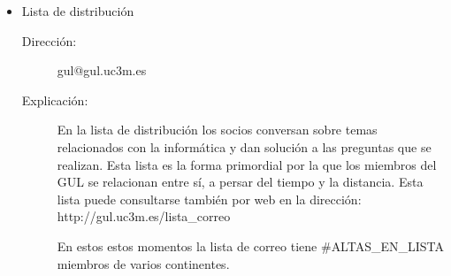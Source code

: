 \documentclass[a4paper,12pt]{report}
\begin{document}
\begin{enumerate}
\begin{itemize}
\pagebreak
\item Lista de distribución
\begin{description}
\item[Dirección:] gul@gul.uc3m.es
\item[Explicación:] En la lista de distribución los socios conversan sobre
temas relacionados con la informática y dan solución a las preguntas que
se realizan. Esta lista es la forma primordial por la que los miembros del GUL se relacionan entre sí, a persar del tiempo y la distancia.
Esta lista puede consultarse también por web en la dirección:
http://gul.uc3m.es/lista\_correo

En estos estos momentos la lista de correo tiene #{ALTAS_EN_LISTA} miembros de varios continentes.


\end{description}
\end{itemize}
\end{enumerate}
\end{document}
